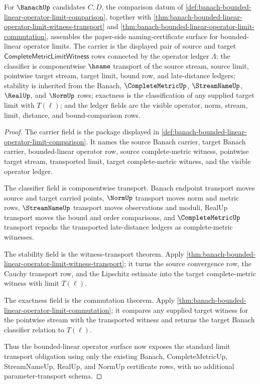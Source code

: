 \begin{theorem}
\label{thm:banach-bounded-linear-operator-limit-namecert-surface}
For $\BanachUp$ candidates $C,D$, the comparison datum of
\autoref{def:banach-bounded-linear-operator-limit-comparison}, together with
\autoref{thm:banach-bounded-linear-operator-limit-witness-transport} and
\autoref{thm:banach-bounded-linear-operator-limit-commutation}, assembles the
paper-side naming-certificate surface for bounded-linear operator limits. The
carrier is the displayed pair of source and target
$\mathsf{CompleteMetricLimitWitness}$ rows connected by the operator ledger
$\Lambda$; the classifier is componentwise $\hsame$ transport of the source
stream, source limit, pointwise target stream, target limit, bound row, and
late-distance ledgers; stability is inherited from the Banach,
$\CompleteMetricUp$, $\StreamNameUp$, $\RealUp$, and $\NormUp$ rows; exactness
is the classification of any supplied target limit with $T(\ell)$; and the
ledger fields are the visible operator, norm, stream, limit, distance, and
bound-comparison rows.
\end{theorem}
\begin{proof}
The carrier field is the package displayed in
\autoref{def:banach-bounded-linear-operator-limit-comparison}. It names the
source Banach carrier, target Banach carrier, bounded-linear operator row,
source complete-metric witness, pointwise target stream, transported limit,
target complete-metric witness, and the visible operator ledger.

The classifier field is componentwise transport. Banach endpoint transport
moves source and target carried points, $\NormUp$ transport moves norm and
metric rows, $\StreamNameUp$ transport moves observations and moduli, RealUp
transport moves the bound and order comparisons, and
$\CompleteMetricUp$ transport repacks the transported late-distance ledgers as
complete-metric witnesses.

The stability field is the witness-transport theorem. Apply
\autoref{thm:banach-bounded-linear-operator-limit-witness-transport}; it
turns the source convergence row, the Cauchy transport row, and the Lipschitz
estimate into the target complete-metric witness with limit $T(\ell)$.

The exactness field is the commutation theorem. Apply
\autoref{thm:banach-bounded-linear-operator-limit-commutation}; it compares
any supplied target witness for the pointwise stream with the transported
witness and returns the target Banach classifier relation to $T(\ell)$.

Thus the bounded-linear operator surface now exposes the standard limit
transport obligation using only the existing Banach, CompleteMetricUp,
StreamNameUp, RealUp, and NormUp certificate rows, with no additional
parameter-transport schema.
\end{proof}

